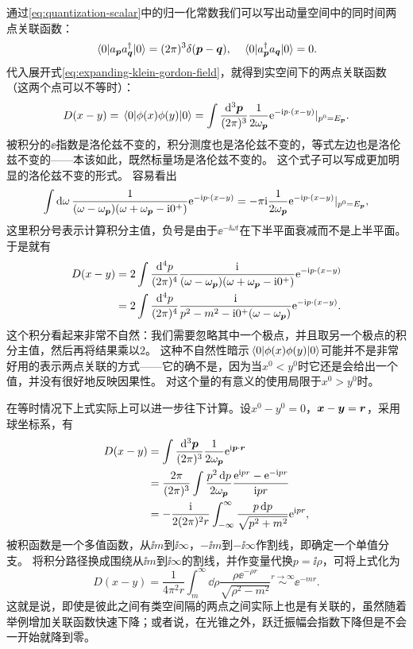 通过\eqref{eq:quantization-scalar}中的归一化常数我们可以写出动量空间中的同时间两点关联函数：
\begin{equation}
    \mel{0}{a_{\vb*{p}} a^\dagger_{\vb*{q}}}{0} = (2\pi)^3 \delta(\vb*{p} - \vb*{q}), \quad \mel{0}{a^\dagger_{\vb*{p}} a_{\vb*{q}}}{0} = 0.
\end{equation}
代入展开式\eqref{eq:expanding-klein-gordon-field}，就得到实空间下的两点关联函数（这两个点可以不等时）：
\begin{equation}
    D(x-y) = \mel{0}{\phi(x) \phi(y)}{0} = \int \frac{\dd[3]{\vb*{p}}}{(2\pi)^3} \frac{1}{2 \omega_{\vb*{p}}} \mathrm{e}^{-\mathrm{i} p \cdot (x - y)} |_{p^0 = E_{\vb*{p}}} .
\end{equation}
被积分的$\ee$指数是洛伦兹不变的，积分测度也是洛伦兹不变的，等式左边也是洛伦兹不变的——本该如此，既然标量场是洛伦兹不变的。
这个式子可以写成更加明显的洛伦兹不变的形式。
容易看出
\[
    \int \dd{\omega} \frac{1}{(\omega - \omega_{\vb*{p}})(\omega + \omega_{\vb*{p}}  - \mathrm{i} 0^+)} \mathrm{e}^{-\mathrm{i} p \cdot (x - y)} = - \pi \mathrm{i} \frac{1}{2 \omega_{\vb*{p}}} \mathrm{e}^{-\mathrm{i} p \cdot (x - y)} |_{p^0 = E_{\vb*{p}}} ,
\]
这里积分号表示计算积分主值，负号是由于$\ee^{-\ii \omega t}$在下半平面衰减而不是上半平面。
于是就有
\begin{equation}
    \begin{aligned}
        D(x-y) &= 2 \int \frac{\dd[4]{p}}{(2\pi)^4} \frac{\mathrm{i}}{(\omega - \omega_{\vb*{p}})(\omega + \omega_{\vb*{p}}  - \mathrm{i} 0^+)} \mathrm{e}^{-\mathrm{i} p \cdot (x - y)} \\
        &= 2 \int \frac{\dd[4]{p}}{(2\pi)^4} \frac{\mathrm{i}}{p^2 - m^2 - \mathrm{i} 0^+ (\omega - \omega_{\vb*{p}})} \mathrm{e}^{-\mathrm{i} p \cdot (x - y)}.
    \end{aligned}
\end{equation}
这个积分看起来非常不自然：我们需要忽略其中一个极点，并且取另一个极点的积分主值，然后再将结果乘以$2$。
这种不自然性暗示$\mel*{0}{\phi(x) \phi(y)}{0}$可能并不是非常好用的表示两点关联的方式——它的确不是，因为当$x^0 < y^0$时它还是会给出一个值，并没有很好地反映因果性。
对这个量的有意义的使用局限于$x^0 > y^0$时。

在等时情况下上式实际上可以进一步往下计算。设$x^0-y^0=0$，$\vb*{x} - \vb*{y} = \vb*{r}$，采用球坐标系，有
\[
    \begin{aligned}
        D(x-y) &= \int \frac{\dd[3]{\vb*{p}}}{(2\pi)^3} \frac{1}{2 \omega_{\vb*{p}}} \mathrm{e}^{\mathrm{i} \vb*{p} \cdot \vb*{r}} \\
        &= \frac{2\pi}{(2\pi)^3} \int \frac{p^2 \dd{p}}{2 \omega_{\vb*{p}}} \frac{\mathrm{e}^{\mathrm{i} p r} - \mathrm{e}^{- \mathrm{i} p r}}{\mathrm{i} p r} \\
        &= - \frac{\mathrm{i}}{2 (2\pi)^2 r} \int_{-\infty}^\infty \frac{p \dd{p}}{\sqrt{p^2 + m^2}} \mathrm{e}^{\mathrm{i} p r},
    \end{aligned}
\]
被积函数是一个多值函数，从$\ii m$到$\ii \infty$，$- \ii m$到$- \ii \infty$作割线，即确定一个单值分支。
将积分路径换成围绕从$\ii m$到$\ii \infty$的割线，并作变量代换$p = \ii \rho$，可将上式化为
\[
    D(x-y) = \frac{1}{4\pi^2 r} \int_{m}^\infty \dd{\rho} \frac{\rho \ee^{-\rho r}}{\sqrt{\rho^2 - m^2}} \stackrel{r \to \infty}{\sim} \ee^{- m r}.
\]
这就是说，即使是彼此之间有类空间隔的两点之间实际上也是有关联的，虽然随着举例增加关联函数快速下降；或者说，在光锥之外，跃迁振幅会指数下降但是不会一开始就降到零。

